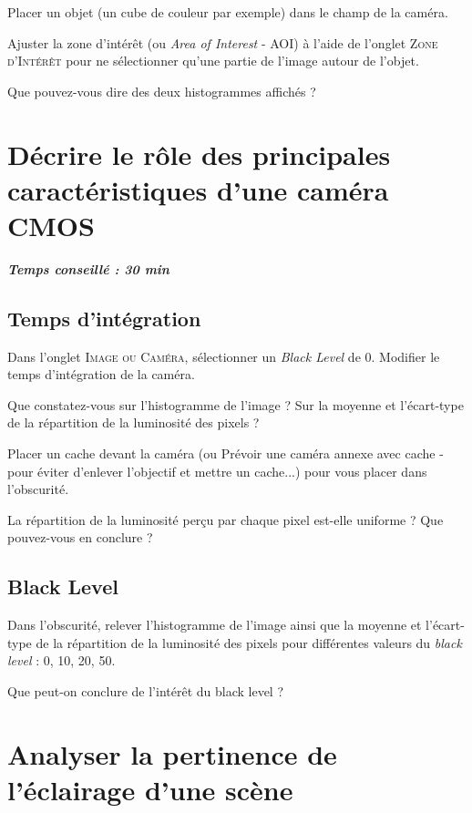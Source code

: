 \documentclass[a4paper,11pt,titlepage]{article} %
\begin{document}
\Manip Placer un objet (un cube de couleur par exemple) dans le champ de la caméra.

\Manip Ajuster la zone d'intérêt (ou \textit{Area of Interest} - AOI) à l'aide de l'onglet \textsc{Zone d'Intérêt} pour ne sélectionner qu'une partie de l'image autour de l'objet.

\Quest Que pouvez-vous dire des deux histogrammes affichés ?



\section{Décrire le rôle des principales caractéristiques d'une caméra CMOS}

\begin{center} \textbf{\textit{Temps conseillé : 30 min}} \end{center}


\subsection{Temps d'intégration}

\Manip Dans l'onglet \textsc{Image ou Caméra}, sélectionner un \textit{Black Level} de 0. Modifier le temps d'intégration de la caméra.

\Quest Que constatez-vous sur l'histogramme de l'image ? Sur la moyenne et l'écart-type de la répartition de la luminosité des pixels ?

\Manip Placer un cache devant la caméra (ou Prévoir une caméra annexe avec cache - pour éviter d'enlever l'objectif et mettre un cache...) pour vous placer dans l'obscurité.

\Quest La répartition de la luminosité perçu par chaque pixel est-elle uniforme ? Que pouvez-vous en conclure ?

\subsection{Black Level}

\Manip Dans l'obscurité, relever l'histogramme de l'image ainsi que la moyenne et l'écart-type de la répartition de la luminosité des pixels pour différentes valeurs du \textit{black level} : 0, 10, 20, 50.

\Quest Que peut-on conclure de l'intérêt du black level ?


\section{Analyser la pertinence de l'éclairage d'une scène}
\end{document}
